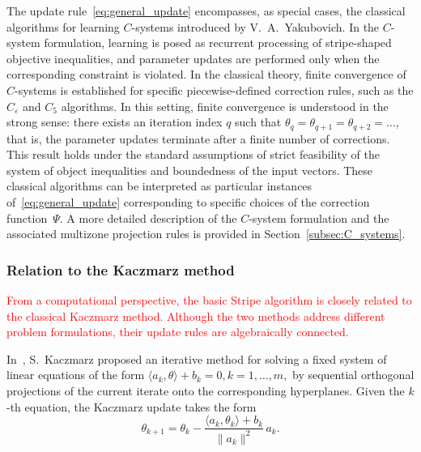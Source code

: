 \documentclass[a4paper,fleqn]{cas-sc}
\begin{document}
The update rule~\eqref{eq:general_update} encompasses, as special cases, the classical algorithms for learning $C$-systems introduced by V.~A.~Yakubovich.
In the $C$-system formulation, learning is posed as recurrent processing of stripe-shaped objective inequalities, and parameter updates are performed only when the corresponding constraint is violated.
In the classical theory, finite convergence of $C$-systems is established for specific piecewise-defined correction rules, such as the $C_\varepsilon$ and $C_5$ algorithms.
In this setting, finite convergence is understood in the strong sense: there exists an iteration index $q$ such that $\theta_q = \theta_{q+1} = \theta_{q+2} = \dots$, that is, the parameter updates terminate after a finite number of corrections.
This result holds under the standard assumptions of strict feasibility of the system of object inequalities
and boundedness of the input vectors.
These classical algorithms can be interpreted as particular instances of~\eqref{eq:general_update} corresponding to specific choices of the correction function~$\Psi$.
A more detailed description of the $C$-system formulation and the associated multizone projection rules is provided in Section~\ref{subsec:C_systems}.


\subsubsection{Relation to the Kaczmarz method}
\label{sec:kaczmarz_relation}

\textcolor{red}{From a computational perspective, the basic Stripe algorithm is closely related to the classical Kaczmarz method. Although the two methods address different problem formulations, their update rules are algebraically connected.}

In~\cite{Kaczmarz1937}, S.~Kaczmarz proposed an iterative method
for solving a fixed system of linear equations of the form
$
\langle a_k, \theta \rangle + b_k = 0, k=1,\dots,m,
$
by sequential orthogonal projections of the current iterate onto the
corresponding hyperplanes.
Given the $k$-th equation, the Kaczmarz update takes the form
\begin{equation}
\label{eq:kaczmarz_general}
\theta_{k+1}
=
\theta_k
-
\frac{\langle a_k, \theta_k \rangle + b_k}{\|a_k\|^2}\, a_k.
\end{equation}
\end{document}
